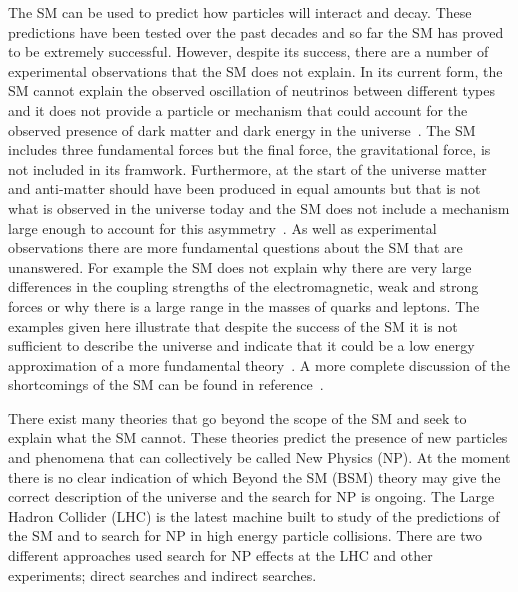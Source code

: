 The SM can be used to predict how particles will interact and decay. These predictions have been tested over the past decades and so far the SM has proved to be extremely successful. %
However, despite its success, there are a number of experimental observations that the SM does not explain. In its current form, the SM cannot explain the observed oscillation of neutrinos between different types~\cite{PhysRevLett.20.1205,Fukuda:1998fd, PhysRevLett.86.5656,PhysRevLett.87.071301} and it does not provide a particle or mechanism that could account for the observed presence of dark matter and dark energy in the universe~\cite{darkmatter1,darkmatter2,Dunkley:2008ie,Ade:2015xua}. 
The SM includes three fundamental forces but the final force, the gravitational force, is not included in its framwork. 
Furthermore, at the start of the universe matter and anti-matter should have been produced in equal amounts but that is not what is observed in the universe today and the SM does not include a mechanism large enough to account for this asymmetry~\cite{Sakharov:1967dj,Gavela:1993ts}.
As well as experimental observations there are more fundamental questions about the SM that are unanswered. For example the SM does not explain why there are very large differences in the coupling strengths of the electromagnetic, weak and strong forces or why there is a large range in the masses of quarks and leptons.
The examples given here illustrate that despite the success of the SM it is not sufficient to describe the universe and indicate that it could be a low energy approximation of a more fundamental theory~\cite{lowenergySM}. A more complete discussion of the shortcomings of the SM can be found in reference~\cite{Ellis:2002wba, Pomarol:2012sb}.

There exist many theories that go beyond the scope of the SM and seek to explain what the SM cannot. These theories predict the presence of new particles and phenomena that can collectively be called New Physics (NP). At the moment there is no clear indication of which Beyond the SM (BSM) theory may give the correct description of the universe and the search for NP is ongoing.
The Large Hadron Collider (LHC) is the latest machine built to study of the predictions of the SM and to search for NP in high energy particle collisions. There are two different approaches used search for NP effects at the LHC and other experiments; direct searches and indirect searches.




